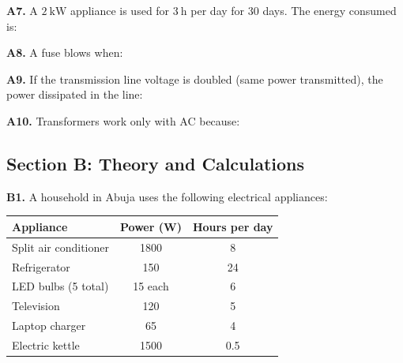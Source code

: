 \begin{exercisebox}[24]

\vspace{0.4cm}

\textbf{A7.} A $2\ \text{kW}$ appliance is used for
$3\ \text{h}$ per day for 30 days. The energy consumed is:


\vspace{0.4cm}

\textbf{A8.} A fuse blows when:


\vspace{0.4cm}

\textbf{A9.} If the transmission line voltage is
doubled (same power transmitted), the power
dissipated in the line:


\vspace{0.4cm}

\textbf{A10.} Transformers work only with AC because:


\vspace{0.6cm}

\subsection*{Section B: Theory and Calculations}

\textbf{B1.} A household in Abuja uses the
following electrical appliances:

\begin{center}
\begin{tabular}{lcc}
\toprule
Appliance & Power (W) & Hours per day\\
\midrule
Split air conditioner & 1800 & 8\\
Refrigerator & 150 & 24\\
LED bulbs (5 total) & 15 each & 6\\
Television & 120 & 5\\
Laptop charger & 65 & 4\\
Electric kettle & 1500 & 0.5\\
\bottomrule
\end{tabular}
\end{center}


\end{exercisebox}
